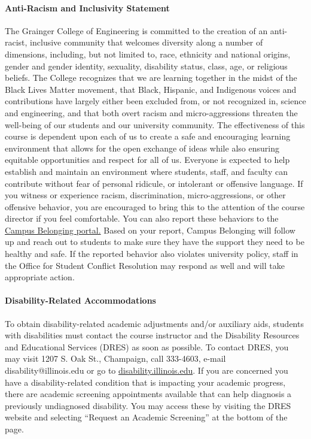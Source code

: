 \documentclass[11pt, a4paper]{article}
\begin{document}
\paragraph{Anti-Racism and Inclusivity Statement} The Grainger College of 
        Engineering is committed to the creation of an anti-racist, inclusive 
        community that welcomes diversity along a number of dimensions, 
        including, but not limited to, race, ethnicity and national origins, 
        gender and gender identity, sexuality, disability status, class, age, 
        or religious beliefs. The College recognizes that we are learning 
        together in the midst of the Black Lives Matter movement, that Black, 
        Hispanic, and Indigenous voices and contributions have largely either 
        been excluded from, or not recognized in, science and engineering, and 
        that both overt racism and micro-aggressions threaten the well-being of 
        our students and our university community.
        The effectiveness of this course is dependent upon each of us to create 
        a safe and encouraging learning environment that allows for the open 
        exchange of ideas while also ensuring equitable opportunities and 
        respect for all of us. Everyone is expected to help establish and 
        maintain an environment where students, staff, and faculty can 
        contribute without fear of personal ridicule, or intolerant or 
        offensive language. If you witness or experience racism, 
        discrimination, micro-aggressions, or other offensive behavior, you are 
        encouraged to bring this to the attention of the course director if you 
        feel comfortable. You can also report these behaviors to the
        \href{https://diversity.illinois.edu/diversity-campus-culture/belonging-resources/}{Campus 
        Belonging portal.}
         Based on your report, Campus Belonging will follow up and reach 
        out to students to make sure they have the support they need to be 
        healthy and safe. If the reported behavior also violates university 
        policy, staff in the Office for Student Conflict Resolution may respond 
        as well and will take appropriate action.  

\paragraph{Disability-Related Accommodations}
To obtain disability-related academic adjustments and/or auxiliary aids, 
students with disabilities must contact the course instructor and the 
Disability Resources and Educational Services (DRES) as soon as possible. To 
contact DRES, you may visit 1207 S. Oak St., Champaign, call 333-4603, e-mail 
disability@illinois.edu or go to 
\href{https://www.disability.illinois.edu}{disability.illinois.edu}.  If you 
are concerned you have a disability-related condition that is impacting your 
academic progress, there are academic screening appointments available that can 
help diagnosis a previously undiagnosed disability. You may access these by 
visiting the DRES website and selecting ``Request an Academic Screening'' at the 
bottom of the page.
\end{document}
